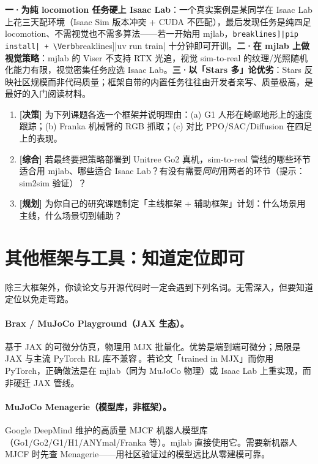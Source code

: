 \begin{pitfall}[选型阶段三个高频踩坑]
\textbf{一·为纯 locomotion 任务硬上 Isaac Lab}：一个真实案例是某同学在 Isaac Lab 上花三天配环境（Isaac Sim 版本冲突 + CUDA 不匹配），最后发现任务是纯四足 locomotion、不需视觉也不需多算法——若一开始用 mjlab，\Verb[breaklines]|pip install| + \Verb[breaklines]|uv run train| 十分钟即可开训。\textbf{二·在 mjlab 上做视觉策略}：mjlab 的 Viser 不支持 RTX 光追，视觉 sim-to-real 的纹理/光照随机化能力有限，视觉密集任务应选 Isaac Lab。\textbf{三·以「Stars 多」论优劣}：Stars 反映社区规模而非代码质量；框架自带的内置任务往往由开发者亲写、质量极高，是最好的入门阅读材料。
\end{pitfall}

\begin{practice}[练习·选型]
\begin{enumerate}
  \item \textbf{[决策]} 为下列课题各选一个框架并说明理由：(a) G1 人形在崎岖地形上的速度跟踪；(b) Franka 机械臂的 RGB 抓取；(c) 对比 PPO/SAC/Diffusion 在四足上的表现。
  \item \textbf{[综合]} 若最终要把策略部署到 Unitree Go2 真机，sim-to-real 管线的哪些环节适合用 mjlab、哪些适合 Isaac Lab？有没有需要\emph{同时}用两者的环节（提示：sim2sim 验证）？
  \item \textbf{[规划]} 为你自己的研究课题制定「主线框架 + 辅助框架」计划：什么场景用主线，什么场景切到辅助？
\end{enumerate}
\end{practice}

\section{其他框架与工具：知道定位即可}
\label{sec:rlmc-eco-tools}

除三大框架外，你读论文与开源代码时一定会遇到下列名词。无需深入，但要知道定位以免走弯路。

\paragraph{Brax / MuJoCo Playground（JAX 生态）。}基于 JAX 的可微分仿真，物理用 MJX 批量化。优势是端到端可微分；局限是 JAX 与主流 PyTorch RL 库不兼容\,\cite{zakka2025playground}。若论文「trained in MJX」而你用 PyTorch，正确做法是在 mjlab（同为 MuJoCo 物理）或 Isaac Lab 上重实现，而非硬迁 JAX 管线。

\paragraph{MuJoCo Menagerie（模型库，非框架）。}Google DeepMind 维护的高质量 MJCF 机器人模型库（Go1/Go2/G1/H1/ANYmal/Franka 等）。mjlab 直接使用它。需要新机器人 MJCF 时先查 Menagerie——用社区验证过的模型远比从零建模可靠。

